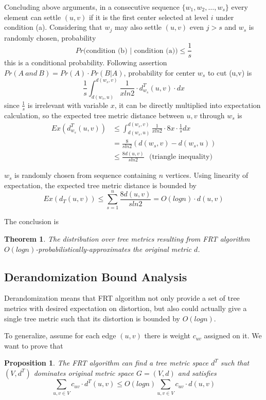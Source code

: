 \documentclass[11pt,twocolumn]{IEEEtran}
\newtheorem{Proposition}{Proposition}[section]
\newtheorem{Theorem}{Theorem}[section]
\begin{document}
Concluding above arguments, in a consecutive sequence $\{w_1,w_2,\dots,w_s\}$ every element can
settle $(u,v)$ if it is the first center selected at level $i$ under condition (a). Considering
that $w_j$ may also settle $(u,v)$ even $j>s$ and $w_s$ is randomly chosen, probability
$$Pr\text{(condition\ (b) } | \text{ condition\ (a))} \leq \frac{1}{s}$$
this is a conditional probability. Following assertion $Pr(A\ and\ B) = Pr(A)\cdot Pr(B|A)$,
probability for center $w_s$ to cut (u,v) is 
$$\frac{1}{s}\int_{d(w_s,u)}^{d(w_s,v)}\frac{1}{xln2}\cdot d_{w_s}^T(u,v)\cdot dx$$
since $\frac{1}{s}$ is irrelevant with variable $x$, it can be directly multiplied into
expectation calculation, so the expected tree metric distance between $u,v$ through $w_s$ is
\begin{align}
Ex\left(d_{w_s}^T(u,v)\right)
&\leq \int_{d(w_s,u)}^{d(w_s,v)}\frac{1}{xln2}\cdot 8x\cdot\frac{1}{s} dx\nonumber\\
&=\frac{8}{sln2}(d(w_s,v)-d(w_s,u))\\
&\leq \frac{8d(u,v)}{sln2}\ \ \ \text{(triangle\ inequality)}
\end{align} 

$w_s$ is randomly chosen from sequence containing $n$ vertices. Using linearity of expectation,
the expected tree metric distance is bounded by
$$Ex(d_T(u,v)) \leq \sum_{s=1}^{n}\frac{8d(u,v)}{sln2} = O(logn)\cdot d(u,v)$$

The conclusion is
\begin{Theorem}
The distribution over tree metrics resulting from FRT algorithm $O(logn)$-probabilistically-approximates the original metric $d$.
\end{Theorem}
\subsection{Derandomization Bound Analysis}
Derandomization means that FRT algorithm not only provide a set of tree metrics with desired expectation
on distortion, but also could actually give a single tree metric such that its distortion is bounded by $O(logn)$.

To generalize, assume for each edge $(u,v)$ there is weight $c_{uv}$ assigned on it. 
We want to prove that
\begin{Proposition}
The FRT algorithm can find a tree metric space $d^T$ such that $(V,d^T)$ dominates original metric space
$G = (V,d)$
and satisfies $$\sum_{u,v\in V}c_{uv}\cdot d^T(u,v)\leq O(logn)\sum_{u,v\in V}c_{uv}\cdot d(u,v)$$
\end{Proposition}
\end{document}
